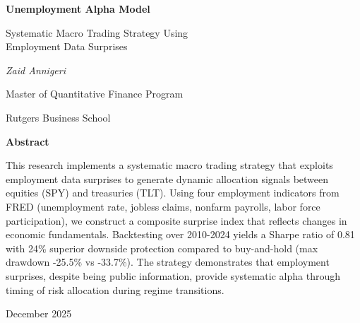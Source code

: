 \documentclass[12pt,a4paper]{article}
\begin{document}
\begin{titlepage}
    \centering
    \vspace*{2cm}

    {\Huge\bfseries Unemployment Alpha Model\par}
    \vspace{0.5cm}
    {\Large Systematic Macro Trading Strategy Using \\ Employment Data Surprises\par}

    \vspace{2cm}

    {\Large\itshape Zaid Annigeri\par}
    \vspace{0.5cm}
    {\large Master of Quantitative Finance Program\par}
    {\large Rutgers Business School\par}

    \vfill

    {\large \textbf{Abstract}\par}
    \vspace{0.5cm}
    \begin{minipage}{0.8\textwidth}
        \small
        This research implements a systematic macro trading strategy that exploits employment data surprises to generate dynamic allocation signals between equities (SPY) and treasuries (TLT). Using four employment indicators from FRED (unemployment rate, jobless claims, nonfarm payrolls, labor force participation), we construct a composite surprise index that reflects changes in economic fundamentals. Backtesting over 2010-2024 yields a Sharpe ratio of 0.81 with 24\% superior downside protection compared to buy-and-hold (max drawdown -25.5\% vs -33.7\%). The strategy demonstrates that employment surprises, despite being public information, provide systematic alpha through timing of risk allocation during regime transitions.
    \end{minipage}

    \vfill

    {\large December 2025\par}
\end{titlepage}

\newpage
\end{document}
